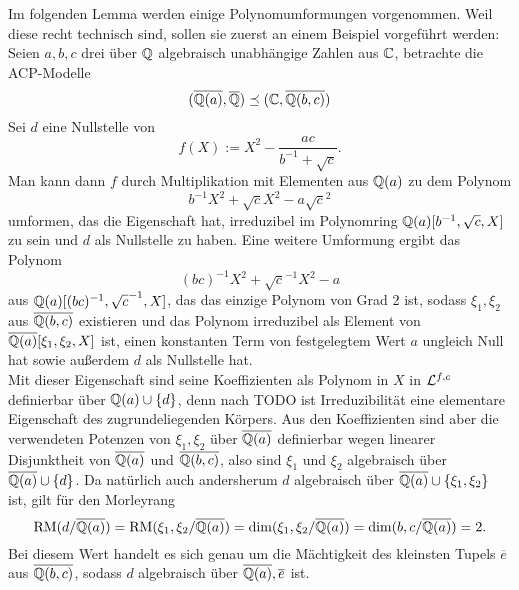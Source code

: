     Im folgenden Lemma werden einige Polynomumformungen vorgenommen. Weil diese recht technisch sind, sollen sie zuerst an einem Beispiel vorgeführt werden: Seien $a,b,c$ drei über $\mathbb{Q}$ algebraisch unabhängige Zahlen aus $\mathbb{C}$, betrachte die ACP-Modelle $$(\overline{\mathbb{Q}(a)},\overline{\mathbb{Q}})\preceq(\mathbb{C},\overline{\mathbb{Q}(b,c)})$$ Sei $d$ eine Nullstelle von $$f(X):=X^2-\frac{ac}{b^{-1}+\sqrt{c}}.$$ Man kann dann $f$ durch Multiplikation mit Elementen aus $\mathbb{Q}(a)$ zu dem Polynom $$b^{-1}X^2+\sqrt{c}X^2-a\sqrt{c}^2$$ umformen, das die Eigenschaft hat, irreduzibel im Polynomring $\mathbb{Q}(a)[b^{-1},\sqrt{c},X]$ zu sein und $d$ als Nullstelle zu haben. Eine weitere Umformung ergibt das Polynom $$(bc)^{-1}X^2+\sqrt{c}^{-1}X^2-a$$ aus $\mathbb{Q}(a)[(bc)^{-1},\sqrt{c}^{-1},X]$, das das einzige Polynom von Grad 2 ist, sodass $\xi_1,\xi_2$ aus $\overline{\mathbb{Q}(b,c)}$ existieren und das Polynom irreduzibel als Element von $\overline{\mathbb{Q}(a)}[\xi_1,\xi_2,X]$ ist, einen konstanten Term von festgelegtem Wert $a$ ungleich Null hat sowie außerdem $d$ als Nullstelle hat.\\
    Mit dieser Eigenschaft sind seine Koeffizienten als Polynom in $X$ in $\mathcal{L}^{f,c}$ definierbar über $\mathbb{Q}(a)\cup\{d\}$, denn nach TODO ist Irreduzibilität eine elementare Eigenschaft des zugrundeliegenden Körpers. Aus den Koeffizienten sind aber die verwendeten Potenzen von $\xi_1,\xi_2$ über $\overline{\mathbb{Q}(a)}$ definierbar wegen linearer Disjunktheit von $\overline{\mathbb{Q}(a)}$ und $\overline{\mathbb{Q}(b,c)}$, also sind $\xi_1$ und $\xi_2$ algebraisch über $\overline{\mathbb{Q}(a)}\cup\{d\}$. Da natürlich auch andersherum $d$ algebraisch über $\overline{\mathbb{Q}(a)}\cup\{\xi_1,\xi_2\}$ ist, gilt für den Morleyrang $$\operatorname{RM}(d/\overline{\mathbb{Q}(a)})=\operatorname{RM}(\xi_1,\xi_2/\overline{\mathbb{Q}(a)})=\dim(\xi_1,\xi_2/\overline{\mathbb{Q}(a)})=\dim(b,c/\overline{\mathbb{Q}(a)})=2.$$
    Bei diesem Wert handelt es sich genau um die Mächtigkeit des kleinsten Tupels $\overline{e}$ aus $\overline{\mathbb{Q}(b,c)}$, sodass $d$ algebraisch über $\overline{\mathbb{Q}(a)},\overline{e}$ ist.
    
